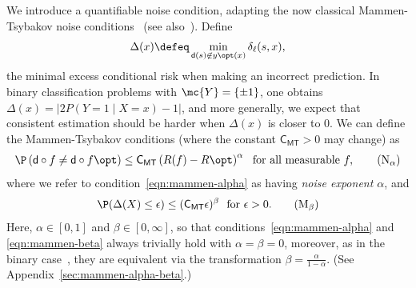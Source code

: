 \documentclass[11pt]{article}
\newcommand{\Prb}{\mathbb{P}}
\newcommand{\constant}{\mathsf{C}}  %
\newcommand{\cstMT}{\constant_{\mathsf{MT}}}
\newcommand{\pred}{\mathsf{d}}  %
\newcommand{\dstr}{P}
\newcommand{\sY}{\mathcal{Y}} %
\newcommand{\tloss}{\ell}  %
\newcommand{\extloss}{\delta_\tloss}
\begin{document}
We introduce a quantifiable noise condition, adapting the
now classical Mammen-Tsybakov noise conditions~\citep{MammenTs99}
(see also~\citet{BartlettJoMc06}).
%
Define
\begin{equation}
  \label{eqn:minimal-wrong-excess-risk}
  \Delta(x) \defeq \min_{\pred(s) \not\in y\opt(x)} \extloss(s, x),
\end{equation}
the minimal excess conditional risk when making an incorrect prediction. 
%
In binary classification problems with
$\mc{Y} = \{\pm 1\}$, one obtains
$\Delta(x) = |2 P(Y = 1 \mid X = x) - 1|$, and more generally,
we expect that consistent estimation should be harder when
$\Delta(x)$ is closer to 0.
%
%
We can define the Mammen-Tsybakov conditions
(where the constant $\cstMT > 0$ may change) as
\begin{equation}
  \label{eqn:mammen-alpha}
  \P\left(\pred \circ f \neq \pred \circ f\opt\right)
  \le \cstMT \left(R(f) - R\opt\right)^\alpha
  ~~ \mbox{for~all~measurable}~ f,
  \tag{N{$_\alpha$}}
\end{equation}
where we refer to condition~\eqref{eqn:mammen-alpha}
as having \emph{noise exponent $\alpha$},
and
\begin{equation}
  \label{eqn:mammen-beta}
  \P(\Delta(X) \leq \epsilon) \leq (\cstMT  \epsilon)^\beta
  ~~ \mbox{for} ~\epsilon > 0.  
  \tag{M$_\beta$}
\end{equation}
\noindent
Here, $\alpha \in [0, 1]$ and $\beta \in [0, \infty]$, so that
conditions~\eqref{eqn:mammen-alpha} and \eqref{eqn:mammen-beta} always
trivially hold with $\alpha = \beta = 0$, moreover, as in the binary
case~\citep[Thm.~3]{BartlettJoMc06}, they are equivalent via
the transformation $\beta =
\frac{\alpha}{1 - \alpha}$.
%
(See Appendix~\ref{sec:mammen-alpha-beta}.)
\end{document}
